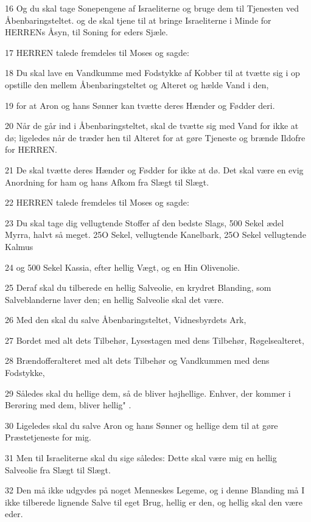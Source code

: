\par 16 Og du skal tage Sonepengene af Israeliterne og bruge dem til Tjenesten ved Åbenbaringsteltet. og de skal tjene til at bringe Israeliterne i Minde for HERRENs Åsyn, til Soning for eders Sjæle.
\par 17 HERREN talede fremdeles til Moses og sagde:
\par 18 Du skal lave en Vandkumme med Fodstykke af Kobber til at tvætte sig i op opstille den mellem Åbenbaringsteltet og Alteret og hælde Vand i den,
\par 19 for at Aron og hans Sønner kan tvætte deres Hænder og Fødder deri.
\par 20 Når de går ind i Åbenbaringsteltet, skal de tvætte sig med Vand for ikke at dø; ligeledes når de træder hen til Alteret for at gøre Tjeneste og brænde Ildofre for HERREN.
\par 21 De skal tvætte deres Hænder og Fødder for ikke at dø. Det skal være en evig Anordning for ham og hans Afkom fra Slægt til Slægt.
\par 22 HERREN talede fremdeles til Moses og sagde:
\par 23 Du skal tage dig vellugtende Stoffer af den bedste Slags, 500 Sekel ædel Myrra, halvt så meget. 25O Sekel, vellugtende Kanelbark, 25O Sekel vellugtende Kalmus
\par 24 og 500 Sekel Kassia, efter hellig Vægt, og en Hin Olivenolie.
\par 25 Deraf skal du tilberede en hellig Salveolie, en krydret Blanding, som Salveblanderne laver den; en hellig Salveolie skal det være.
\par 26 Med den skal du salve Åbenbaringsteltet, Vidnesbyrdets Ark,
\par 27 Bordet med alt dets Tilbehør, Lysestagen med dens Tilbehør, Røgelsealteret,
\par 28 Brændofferalteret med alt dets Tilbehør og Vandkummen med dens Fodstykke,
\par 29 Således skal du hellige dem, så de bliver højhellige. Enhver, der kommer i Berøring med dem, bliver hellig" .
\par 30 Ligeledes skal du salve Aron og hans Sønner og hellige dem til at gøre Præstetjeneste for mig.
\par 31 Men til Israeliterne skal du sige således: Dette skal være mig en hellig Salveolie fra Slægt til Slægt.
\par 32 Den må ikke udgydes på noget Menneskes Legeme, og i denne Blanding må I ikke tilberede lignende Salve til eget Brug, hellig er den, og hellig skal den være eder.

